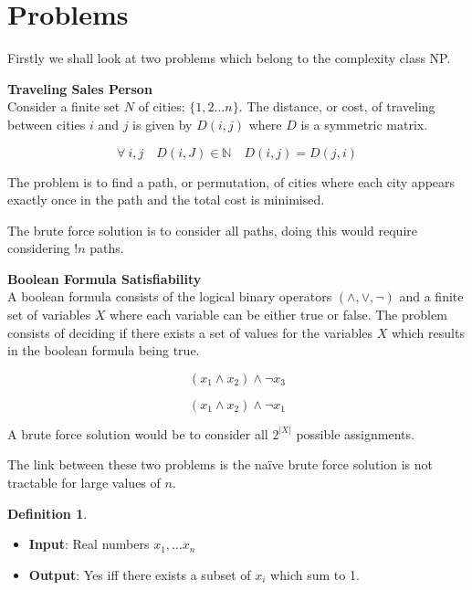 \documentclass{article}
\theoremstyle{definition}
\newtheorem{definition}{Definition}[section]
\begin{document}
\tableofcontents
\pagebreak

\section{Problems}
Firstly we shall look at two problems which belong to the complexity class NP.

\textbf{Traveling Sales Person}\\
Consider a finite set $N$ of cities; $\{1, 2 \dots n\}$. The distance, or cost,
of traveling between cities $i$ and $j$ is given by $D(i,j)$ where $D$
is a symmetric matrix.

$$\forall\ i, j\quad D(i,J) \in \mathbb{N}\quad D(i,j) = D(j,i)$$

The problem is to find a path, or permutation, of
cities where each city appears exactly once in the path and the total
cost is minimised.

The brute force solution is to consider all paths, doing this would require
considering $!n$ paths.

\textbf{Boolean Formula Satisfiability}\\
A boolean formula consists of the logical binary operators $(\land, \lor, \neg)$
and a finite set of variables $X$ where each variable can be either true or false.
The problem consists of deciding if there exists a set of values for the variables $X$
which results in the boolean formula being true.

$$(x_1 \land x_2) \land \neg x_3$$

$$(x_1 \land x_2) \land \neg x_1$$

A brute force solution would be to consider all $2^{|X|}$ possible assignments.

The link between these two problems is the na\"ive brute force solution is not
tractable for large values of $n$.

\begin{definition}
    \begin{itemize}
        \item \textbf{Input}: Real numbers $x_1,\dots x_n$
        \item \textbf{Output}: Yes iff there exists a subset of $x_i$ which sum to 1.
    \end{itemize}
\end{definition}

\pagebreak


\pagebreak


\pagebreak


\pagebreak


\pagebreak


%

\pagebreak


\pagebreak


\pagebreak

\end{document}
